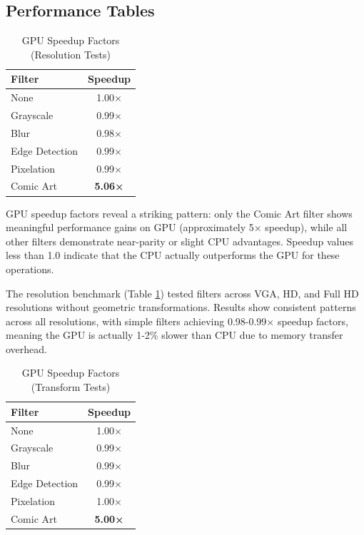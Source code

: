 \documentclass[12pt,a4paper]{article}
\begin{document}
\subsection{Performance Tables}

\begin{table}
    \centering
    \caption{GPU Speedup Factors (Resolution Tests)}
    \label{tab:speedup_resolution}
    \begin{tabular}{lc}
        \toprule
        \textbf{Filter} & \textbf{Speedup} \\
        \toprule
        None & 1.00× \\
        Grayscale & 0.99× \\
        Blur & 0.98× \\
        Edge Detection & 0.99× \\
        Pixelation & 0.99× \\
        Comic Art & \textbf{5.06×} \\
        \bottomrule
    \end{tabular}
\end{table}

GPU speedup factors reveal a striking pattern: only the Comic Art filter shows meaningful performance gains on GPU (approximately 5× speedup), while all other filters demonstrate near-parity or slight CPU advantages. Speedup values less than 1.0 indicate that the CPU actually outperforms the GPU for these operations.

The resolution benchmark (Table \ref{tab:speedup_resolution}) tested filters across VGA, HD, and Full HD resolutions without geometric transformations. Results show consistent patterns across all resolutions, with simple filters achieving 0.98-0.99× speedup factors, meaning the GPU is actually 1-2\% slower than CPU due to memory transfer overhead.

\begin{table}
    \centering
    \caption{GPU Speedup Factors (Transform Tests)}
    \label{tab:speedup_transforms}
    \begin{tabular}{lc}
        \toprule
        \textbf{Filter} & \textbf{Speedup} \\
        \toprule
        None & 1.00× \\
        Grayscale & 0.99× \\
        Blur & 0.99× \\
        Edge Detection & 0.99× \\
        Pixelation & 1.00× \\
        Comic Art & \textbf{5.00×} \\
        \bottomrule
    \end{tabular}
\end{table}
\end{document}
